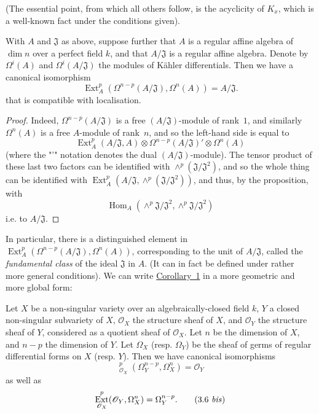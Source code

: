 \documentclass{article}
\theoremstyle{plain}
\newenvironment{corollary}[1]
  {\renewcommand\theinnercorollary{#1}\innercorollary}
  {\endinnercorollary}
\theoremstyle{definition}
\newcommand{\scr}[1]{{\mathscr{#1}}}
\DeclareMathOperator{\Ext}{Ext}
\DeclareMathOperator{\Hom}{Hom}
\DeclareMathOperator{\shExt}{\underline{Ext}}
\newcommand{\oldpage}[1]{\marginpar{\footnotesize$\Big\vert$ \textit{p.~#1}}}
\begin{document}
(The essential point, from which all others follow, is the acyclicity of $K_x$, which is a well-known fact under the conditions given).

\begin{corollary}{1}
\label{proposition4corollary1}
  With $A$ and $\mathfrak{J}$ as above, suppose further that $A$ is a regular affine algebra of $\dim n$ over a perfect field $k$, and that $A/\mathfrak{J}$ is a regular affine algebra.
  Denote by $\Omega^i(A)$ and $\Omega^i(A/\mathfrak{J})$ the modules of K\"{a}hler differentials.
  Then we have a canonical isomorphism
  \[
  \label{3.5}
    \Ext_A^p(\Omega^{n-p}(A/\mathfrak{J}),\Omega^n(A)) = A/\mathfrak{J}.
  \tag{3.5}
  \]
  that is compatible with localisation.
\end{corollary}

\begin{proof}
  Indeed, $\Omega^{n-p}(A/\mathfrak{J})$ is a free $(A/\mathfrak{J})$-module of rank~$1$, and similarly $\Omega^n(A)$ is a free $A$-module of rank~$n$, and so the left-hand side is equal to
  \[
    \Ext_A^p(A/\mathfrak{J},A) \otimes \Omega^{n-p}(A/\mathfrak{J})' \otimes \Omega^n(A)
  \]
  (where the "'" notation denotes the dual $(A/\mathfrak{J})$-module).
  The tensor product of these last two factors can be identified with $\wedge^p(\mathfrak{J}/\mathfrak{J}^2)$, and so the whole thing can be identified with $\Ext_A^p(A/\mathfrak{J},\wedge^p(\mathfrak{J}/\mathfrak{J}^2))$, and thus, by the proposition, with
  \[
    \Hom_A(\wedge^p \mathfrak{J}/\mathfrak{J}^2,\wedge^p \mathfrak{J}/\mathfrak{J}^2)
  \]
  i.e. to $A/\mathfrak{J}$.
\end{proof}

In particular, there is a distinguished element in $\Ext_A^p(\Omega^{n-p}(A/\mathfrak{J}),\Omega^n(A))$, corresponding to the unit of $A/\mathfrak{J}$, called the \emph{fundamental class} of the ideal $\mathfrak{J}$ in $A$.
(It can in fact be defined under rather more general conditions).
We can write \hyperref[proposition4corollary1]{Corollary~1} in a more geometric and more global form:

\begin{corollary}{2}
\label{proposition4corollary2}
  Let $X$ be a non-singular variety over an algebraically-closed field $k$, $Y$ a closed non-singular subvariety of $X$, $\scr{O}_X$ the structure sheaf of $X$, and $\scr{O}_Y$ the structure sheaf of $Y$, considered as a quotient sheaf of $\scr{O}_X$.
  Let $n$ be the dimension of $X$, and $n-p$ the dimension of $Y$.
\oldpage{149-08}
  Let $\Omega_X$ (resp. $\Omega_Y$) be the sheaf of germs of regular differential forms on $X$ (resp. $Y$).
  Then we have canonical isomorphisms
  \[
  \label{3.6}
    \shExt_{\scr{O}_X}^p(\Omega_Y^{n-p},\Omega_X^n) = \scr{O}_Y
  \tag{3.6}
  \]
  as well as
  \[
  \label{3.6bis}
    \Ext_{\scr{O}_X}^p(\scr{O}_Y,\Omega_X^n) = \Omega_Y^{n-p}.
  \tag{3.6 \emph{bis}}
  \]
\end{corollary}
\end{document}

